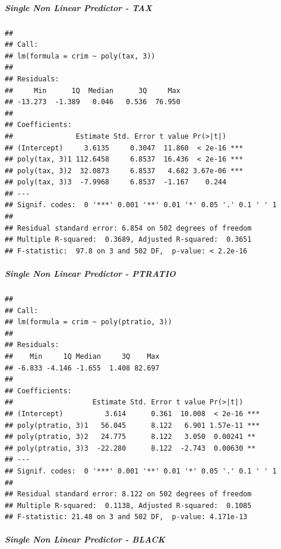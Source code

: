 \documentclass[
]{article}
\begin{document}
\hypertarget{single-non-linear-predictor---tax}{%
\subparagraph{\texorpdfstring{\textbf{Single Non Linear Predictor -
TAX}}{Single Non Linear Predictor - TAX}}\label{single-non-linear-predictor---tax}}

\begin{verbatim}
## 
## Call:
## lm(formula = crim ~ poly(tax, 3))
## 
## Residuals:
##     Min      1Q  Median      3Q     Max 
## -13.273  -1.389   0.046   0.536  76.950 
## 
## Coefficients:
##               Estimate Std. Error t value Pr(>|t|)    
## (Intercept)     3.6135     0.3047  11.860  < 2e-16 ***
## poly(tax, 3)1 112.6458     6.8537  16.436  < 2e-16 ***
## poly(tax, 3)2  32.0873     6.8537   4.682 3.67e-06 ***
## poly(tax, 3)3  -7.9968     6.8537  -1.167    0.244    
## ---
## Signif. codes:  0 '***' 0.001 '**' 0.01 '*' 0.05 '.' 0.1 ' ' 1
## 
## Residual standard error: 6.854 on 502 degrees of freedom
## Multiple R-squared:  0.3689, Adjusted R-squared:  0.3651 
## F-statistic:  97.8 on 3 and 502 DF,  p-value: < 2.2e-16
\end{verbatim}

\hypertarget{single-non-linear-predictor---ptratio}{%
\subparagraph{\texorpdfstring{\textbf{Single Non Linear Predictor -
PTRATIO}}{Single Non Linear Predictor - PTRATIO}}\label{single-non-linear-predictor---ptratio}}

\begin{verbatim}
## 
## Call:
## lm(formula = crim ~ poly(ptratio, 3))
## 
## Residuals:
##    Min     1Q Median     3Q    Max 
## -6.833 -4.146 -1.655  1.408 82.697 
## 
## Coefficients:
##                   Estimate Std. Error t value Pr(>|t|)    
## (Intercept)          3.614      0.361  10.008  < 2e-16 ***
## poly(ptratio, 3)1   56.045      8.122   6.901 1.57e-11 ***
## poly(ptratio, 3)2   24.775      8.122   3.050  0.00241 ** 
## poly(ptratio, 3)3  -22.280      8.122  -2.743  0.00630 ** 
## ---
## Signif. codes:  0 '***' 0.001 '**' 0.01 '*' 0.05 '.' 0.1 ' ' 1
## 
## Residual standard error: 8.122 on 502 degrees of freedom
## Multiple R-squared:  0.1138, Adjusted R-squared:  0.1085 
## F-statistic: 21.48 on 3 and 502 DF,  p-value: 4.171e-13
\end{verbatim}

\hypertarget{single-non-linear-predictor---black}{%
\subparagraph{\texorpdfstring{\textbf{Single Non Linear Predictor -
BLACK}}{Single Non Linear Predictor - BLACK}}\label{single-non-linear-predictor---black}}
\end{document}
